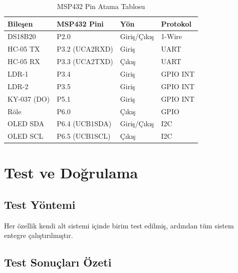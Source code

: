\documentclass[12pt, a4paper]{article}
\begin{document}
\begin{table}[H]
  \centering
  \caption{MSP432 Pin Atama Tablosu}
  \label{tab:pinler}
  \begin{tabular}{llll}
    \toprule
    \textbf{Bileşen}  & \textbf{MSP432 Pini} & \textbf{Yön}  & \textbf{Protokol} \\
    \midrule
    DS18B20           & P2.0                 & Giriş/Çıkış   & 1-Wire       \\
    HC-05 TX          & P3.2 (UCA2RXD)       & Giriş         & UART         \\
    HC-05 RX          & P3.3 (UCA2TXD)       & Çıkış         & UART         \\
    LDR-1             & P3.4                 & Giriş         & GPIO INT     \\
    LDR-2             & P3.5                 & Giriş         & GPIO INT     \\
    KY-037 (DO)       & P5.1                 & Giriş         & GPIO INT     \\
    Röle              & P6.0                 & Çıkış         & GPIO         \\
    OLED SDA          & P6.4 (UCB1SDA)       & Giriş/Çıkış   & I2C          \\
    OLED SCL          & P6.5 (UCB1SCL)       & Çıkış         & I2C          \\
    \bottomrule
  \end{tabular}
\end{table}

\section{Test ve Doğrulama}

\subsection{Test Yöntemi}

Her özellik kendi alt sistemi içinde birim test edilmiş, ardından tüm sistem
entegre çalıştırılmıştır.

\subsection{Test Sonuçları Özeti}
\end{document}
